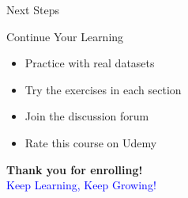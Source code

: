 \documentclass{beamer}
\begin{document}
	\begin{frame}{Next Steps}
		\begin{block}{Continue Your Learning}
			\begin{itemize}
				\small
				\item Practice with real datasets
				\item Try the exercises in each section
				\item Join the discussion forum
				\item Rate this course on Udemy
			\end{itemize}
		\end{block}
		
		\begin{center}
			\vspace{0.3cm}
			\textbf{Thank you for enrolling!} \\
			\vspace{0.2cm}
			\textcolor{blue}{Keep Learning, Keep Growing!}
		\end{center}
	\end{frame}
	
\end{document}
